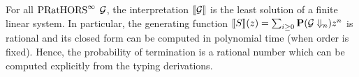 \documentclass{easychair}
\begin{document}
%
%
%
%
\begin{theorem}\label{thm:rat}
	For all $\text{PRatHORS}^{\infty}$ $\mathcal{G}$, 
	the interpretation $\llbracket\mathcal{G}\rrbracket$ is the least solution of a finite linear system. In particular, the generating function $\llbracket S\rrbracket(z)= \sum_{i \geq 0} \mathbf{P}(\mathcal{G} \Downarrow_n)z^n$ is rational and its closed form can be computed in polynomial time (when order is fixed).
Hence, the probability of termination is a rational number which can be computed explicitly from the typing derivations.

	 
\end{theorem}  
\end{document}
